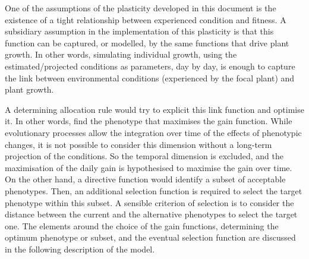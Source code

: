 

One of the assumptions of the plasticity developed in this document is the existence of a tight relationship between experienced condition and fitness. A subsidiary assumption in the implementation of this plasticity is that this function can be captured, or modelled, by the same functions that drive plant growth. In other words, simulating individual growth, using the estimated/projected conditions as parameters, day by day, is enough to capture the link between environmental conditions (experienced by the focal plant) and plant growth. 

A determining allocation rule would try to explicit this link function and optimise it. In other words, find the phenotype that maximises the gain function. While evolutionary processes allow the integration over time of the effects of phenotypic changes, it is not possible to consider this dimension without a long-term projection of the conditions. So the temporal dimension is excluded, and the maximisation of the daily gain is hypothesised to maximise the gain over time. On the other hand, a directive function would identify a subset of acceptable phenotypes. Then, an additional selection function is required to select the target phenotype within this subset. A sensible criterion of selection is to consider the distance between the current and the alternative phenotypes to select the target one. The elements around the choice of the gain functions, determining the optimum phenotype or subset, and the eventual selection function are discussed in the following description of the model.\\

